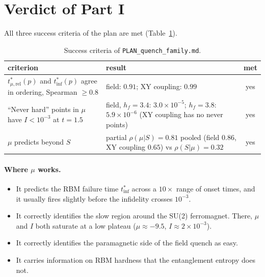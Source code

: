 \documentclass[11pt,a4paper]{article}
\newcommand{\inff}{I}
\newcommand{\tmur}{t^*_{\mu,\mathrm{rel}}}
\newcommand{\tinf}{t^*_{\mathrm{inf}}}
\begin{document}
\section{Verdict of Part I}
\label{sec:verdict1}

All three success criteria of the plan are met (Table~\ref{tab:verdict1}).

\begin{table}[h]
  \centering
  \caption{Success criteria of \texttt{PLAN\_quench\_family.md}.}
  \label{tab:verdict1}
  \small
  \begin{tabular}{p{6.6cm}p{6.6cm}c}
    \toprule
    criterion & result & met\\
    \midrule
    $\tmur(p)$ and $\tinf(p)$ agree in ordering, Spearman $\ge0.8$ & field: $0.91$; XY coupling: $0.99$ & yes\\
    ``Never hard'' points in $\mu$ have $\inff<10^{-3}$ at $t=1.5$ & field, $h_f=3.4$: $3.0\times10^{-5}$; $h_f=3.8$: $5.9\times10^{-6}$ (XY coupling has no never points) & yes\\
    $\mu$ predicts beyond $S$ & partial $\rho(\mu|S)=0.81$ pooled (field $0.86$, XY coupling $0.65$) vs $\rho(S|\mu)=0.32$ & yes\\
    \bottomrule
  \end{tabular}
\end{table}

\paragraph{Where $\mu$ works.}
\begin{itemize}
  \item It predicts the RBM failure time $\tinf$ across a $10\times$ range of onset times, and it
    usually fires slightly before the infidelity crosses $10^{-3}$.
  \item It correctly identifies the slow region around the SU(2) ferromagnet. There, $\mu$ and
    $\inff$ both saturate at a low plateau ($\mu\approx-9.5$, $\inff\approx2\times10^{-3}$).
  \item It correctly identifies the paramagnetic side of the field quench as easy.
  \item It carries information on RBM hardness that the entanglement entropy does not.
\end{itemize}
\end{document}
